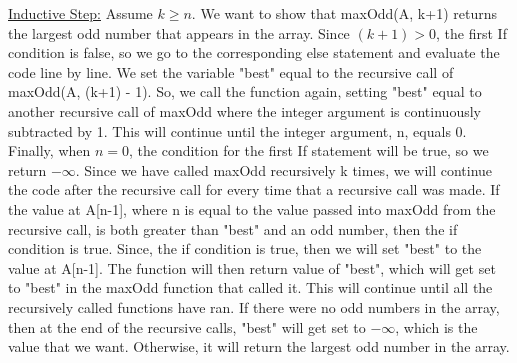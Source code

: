 \documentclass{article}
\begin{document}
    \noindent \underline{Inductive Step:} \newline
    Assume $k \geq n$. We want to show that maxOdd(A, k+1) returns the largest odd number
    that appears in the array. Since $(k+1) > 0$, the first If condition is false, so 
    we go to the corresponding else statement and evaluate the code line by line. 
    We set the variable "best" equal to the recursive call of maxOdd(A, (k+1) - 1). 
    So, we call the function again, setting "best" equal to another recursive 
    call of maxOdd where the integer argument is continuously subtracted by 1. This will
    continue until the integer argument, n, equals 0. Finally, when $n=0$, the 
    condition for the first If statement will be true, so we return $-\infty$. 
    Since we have called maxOdd recursively k times, we will continue the code
    after the recursive call for every time that a recursive call was made. 
    If the value at A[n-1], where n is equal to the value passed into maxOdd from the
    recursive call, is both greater than "best" and an odd number, then the 
    if condition is true. Since, the if condition is true, then we will set 
    "best" to the value at A[n-1]. The function will then return value of "best", 
    which will get set to "best" in the maxOdd function that called it. 
    This will continue until all the recursively called functions have ran. 
    If there were no odd numbers in the array, then at the end of the recursive calls, 
    "best" will get set to $-\infty$, which is the value that we want. Otherwise, it
    will return the largest odd number in the array.  
\end{document}
